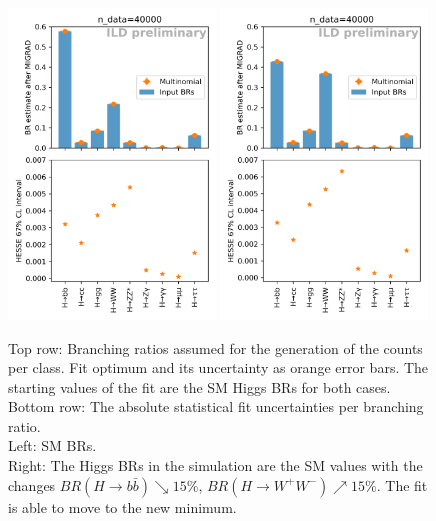 \documentclass[11pt, hidelinks, a4paper]{scrartcl}
\begin{document}
\begin{figure}[ht]
    \centering
    \includegraphics[width=0.49\textwidth, keepaspectratio]{br_estimates}
    \includegraphics[width=0.49\textwidth, keepaspectratio]{changed_br_estimates}
    \caption{
        Top row: Branching ratios assumed for the generation of the counts per class.
        Fit optimum and its uncertainty as orange error bars.
        The starting values of the fit are
        the SM Higgs BRs for both cases.
        \\
        Bottom row: The absolute statistical fit uncertainties per branching ratio.
        \\
        Left: SM BRs.
        \\
        Right: The Higgs BRs in the simulation are the SM values
        with the changes
        $BR(H \to b \bar{b}) \searrow 15\%$, $BR(H \to W^+W^-) \nearrow 15\%$.
        The fit is able to move to the new minimum.
    }\label{fig:brs}
\end{figure}
\end{document}
